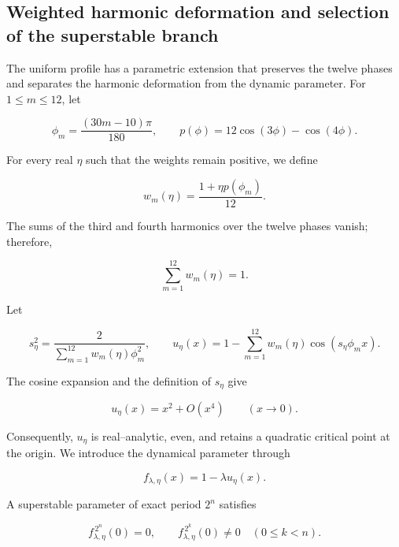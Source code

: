 \subsection{Weighted harmonic deformation and selection of the superstable branch}
\label{mab:sec:extension-dodecafasica-ponderada-armonica}

The uniform profile has a parametric extension that preserves the twelve
phases and separates the harmonic deformation from the dynamic parameter. For
\(1\le m\le12\), let

\begin{equation}
 \phi_m=\frac{(30m-10)\pi}{180},
 \qquad
 p(\phi)=12\cos(3\phi)-\cos(4\phi).
 \label{mab:eq:fases-y-deformacion-armonica-armonizada}
\end{equation}

For every real \(\eta\) such that the weights remain positive, we define

\begin{equation}
 w_m(\eta)=\frac{1+\eta p(\phi_m)}{12}.
 \label{mab:eq:pesos-dodecafasicos-armonizados}
\end{equation}

The sums of the third and fourth harmonics over the twelve phases vanish;
therefore,

\[
 \sum_{m=1}^{12}w_m(\eta)=1.
\]

Let

\begin{equation}
 s_\eta^2=\frac{2}{\sum_{m=1}^{12}w_m(\eta)\phi_m^2},
 \qquad
 u_\eta(x)=1-\sum_{m=1}^{12}w_m(\eta)
 \cos(s_\eta\phi_m x).
 \label{mab:eq:familia-ponderada-armonizada}
\end{equation}

The cosine expansion and the definition of \(s_\eta\) give

\[
 u_\eta(x)=x^2+O(x^4)\qquad(x\to0).
\]

Consequently, \(u_\eta\) is real--analytic, even, and retains a quadratic
critical point at the origin. We introduce the dynamical parameter through

\begin{equation}
 f_{\lambda,\eta}(x)=1-\lambda u_\eta(x).
 \label{mab:eq:familia-feigenbaum-ponderada-armonizada}
\end{equation}

A superstable parameter of exact period \(2^n\) satisfies

\[
 f_{\lambda,\eta}^{\,2^n}(0)=0,
 \qquad
 f_{\lambda,\eta}^{\,2^k}(0)\ne0\quad(0\le k<n).
\]

